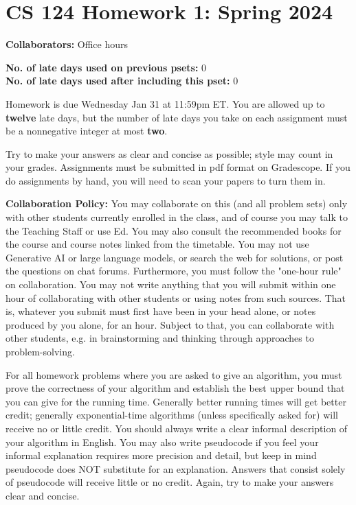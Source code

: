 \documentclass[11pt]{article}
\begin{document}


        \section*{CS 124 Homework 1: Spring 2024}


        \textbf{Collaborators: } Office hours

        \textbf{No. of late days used on previous psets: } 0 \\
        \textbf{No. of late days used after including this pset: } 0

Homework is due {\color{blue} Wednesday Jan 31 at 11:59pm ET}. You are allowed up to {\bf twelve} late days, but the number of late days you take on each assignment must be a nonnegative integer at most {\bf two}.

Try to make your answers as clear and concise as possible;
style may count in your grades. Assignments must be submitted in pdf format on Gradescope. If you do assignments by hand, you will need to scan your papers to turn them in.


{\bf Collaboration Policy:} You may collaborate on this (and all problem sets) only with other students currently enrolled in the class, and of course you may talk to the Teaching Staff or use Ed. You may also consult the recommended books for the course and course notes linked from the timetable. You may not use Generative AI or large language models, or search the web for solutions, or post the questions on chat forums. Furthermore, you must follow the "one-hour rule" on collaboration.  You may not write anything that you will submit within one hour of collaborating with other students or using notes from such sources. That is, whatever you submit must first have been in your head alone, or notes produced by you alone, for an hour. Subject to that, you can collaborate with other students, e.g. in brainstorming and thinking through approaches to problem-solving.


For all homework problems where you are asked to give an algorithm, you must prove the correctness
of your algorithm and establish the best upper bound that you can give for the running time. Generally
better running times will get better credit; generally exponential-time algorithms (unless specifically asked
for) will receive no or little credit. You should always write a clear informal description of your algorithm
in English. You may also write pseudocode if you feel your informal explanation requires more precision
and detail, but keep in mind pseudocode does NOT substitute for an explanation. Answers that consist
solely of pseudocode will receive little or no credit. Again, try to make your answers clear and concise.
\end{document}
